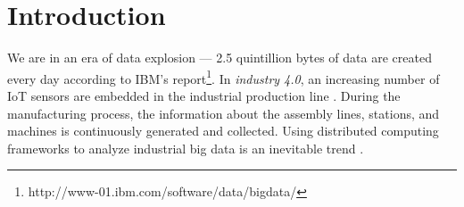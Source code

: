\section{Introduction}\label{sec:introduction}
We are in an era of data explosion --- 2.5 quintillion bytes of data are created every day according to IBM's report\footnote{http://www-01.ibm.com/software/data/bigdata/}.
{\color{black}
In \textit{industry 4.0}, an increasing number of IoT sensors are embedded in the industrial production line \cite{lade2017manufacturing}.
During the manufacturing process, the information about the assembly lines, stations, and machines is continuously generated and collected.
Using distributed computing frameworks to analyze industrial big data is an inevitable trend \cite{lee2014service}.
}

